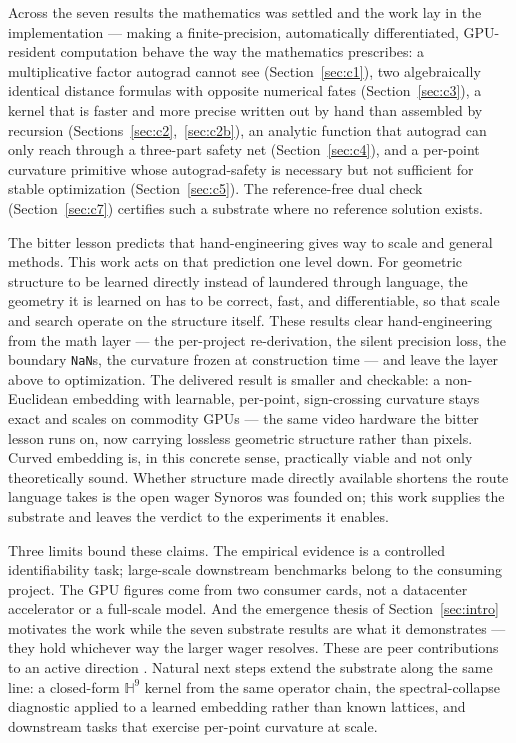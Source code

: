 \documentclass{article}
\newcommand{\Hyp}{\mathbb{H}}
\newcommand{\code}[1]{\texttt{#1}}
\begin{document}
Across the seven results the mathematics was settled and the work lay in
the implementation --- making a finite-precision, automatically
differentiated, GPU-resident computation behave the way the mathematics
prescribes: a multiplicative factor autograd cannot see
(Section~\ref{sec:c1}), two algebraically identical distance formulas
with opposite numerical fates (Section~\ref{sec:c3}), a kernel that is
faster and more precise written out by hand than assembled by recursion
(Sections~\ref{sec:c2},~\ref{sec:c2b}), an analytic function that autograd can only reach
through a three-part safety net (Section~\ref{sec:c4}), and a per-point
curvature primitive whose autograd-safety is necessary but not sufficient
for stable optimization (Section~\ref{sec:c5}). The reference-free dual
check (Section~\ref{sec:c7}) certifies such a substrate where no
reference solution exists.

The bitter lesson predicts that hand-engineering gives way to scale and
general methods. This work acts on that prediction one level down. For
geometric structure to be learned directly instead of laundered through
language, the geometry it is learned on has to be correct, fast, and
differentiable, so that scale and search operate on the structure
itself. These results clear hand-engineering from the math layer --- the
per-project re-derivation, the silent precision loss, the boundary
\code{NaN}s, the curvature frozen at construction time --- and leave the
layer above to optimization. The delivered result is smaller and
checkable: a non-Euclidean embedding with learnable, per-point,
sign-crossing curvature stays exact and scales on commodity GPUs --- the
same video hardware the bitter lesson runs on, now carrying lossless
geometric structure rather than pixels. Curved embedding is, in this
concrete sense, practically viable and not only theoretically sound.
Whether structure made directly available shortens the route language
takes is the open wager Synoros was founded on; this work supplies the
substrate and leaves the verdict to the experiments it enables.

Three limits bound these claims. The empirical evidence is a controlled
identifiability task; large-scale downstream benchmarks belong to the
consuming project. The GPU figures come from two consumer cards, not a
datacenter accelerator or a full-scale model. And the emergence thesis of Section~\ref{sec:intro} motivates the work
while the seven substrate results are what it demonstrates --- they hold
whichever way the larger wager resolves. These are peer contributions to
an active direction
\citep{digiovanni2022heterogeneous,guo2025graphmore,gu2019learning}.
Natural next steps extend the substrate along the same line: a
closed-form $\Hyp^9$ kernel from the same operator chain, the
spectral-collapse diagnostic applied to a learned embedding rather than
known lattices, and downstream tasks that exercise per-point curvature at
scale.
\end{document}
